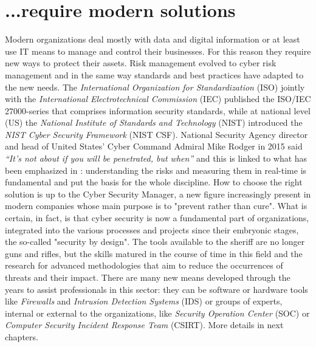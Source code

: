 \section{...require modern solutions}
Modern organizations deal mostly with data and digital information or at least use IT means to manage and control their businesses. For this reason they require new ways to protect their assets. Risk management evolved to cyber risk management and in the same way standards and best practices have adapted to the new needs. The \textit{International Organization for Standardization} (ISO) jointly with the \textit{International Electrotechnical Commission} (IEC) published the ISO/IEC 27000-series that comprises information security standards, while at national level (US) the \textit{National Institute of Standards and Technology} (NIST) introduced the \textit{NIST Cyber Security Framework} (NIST CSF).\newline
National Security Agency director and head of United States’ Cyber Command Admiral Mike Rodger in 2015 said \textit{“It’s not about if you will be penetrated, but when”} and this is linked to what has been emphasized in \cite{Marvell2015}: understanding the risks and measuring them in real-time is fundamental and put the basis for the whole discipline. How to choose the right solution is up to the Cyber Security Manager, a new figure increasingly present in modern companies whose main purpose is to "prevent rather than cure". What is certain, in fact, is that cyber security is now a fundamental part of organizations, integrated into the various processes and projects since their embryonic stages, the so-called "security by design". The tools available to the sheriff are no longer guns and rifles, but the skills matured in the course of time in this field and the research for advanced methodologies that aim to reduce the occurrences of threats and their impact. There are many new means developed through the years to assist professionals in this sector: they can be software or hardware tools like \textit{Firewalls} and \textit{Intrusion Detection Systems} (IDS) or groups of experts, internal or external to the organizations, like \textit{Security Operation Center} (SOC) or \textit{Computer Security Incident Response Team} (CSIRT). More details in next chapters.
